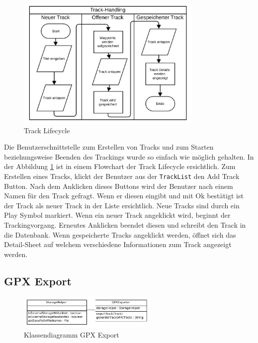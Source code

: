\begin{figure}[h]
  \centering
  \includegraphics[width=0.8\textwidth]{images/trackworkflow.pdf}
  \caption[Track Lifecycle]{Track Lifecycle}
  \label{fig:tracklifecycle}
\end{figure}

Die Benutzerschnittstelle zum Erstellen von Tracks und zum Starten beziehungsweise Beenden des Trackings wurde so einfach wie möglich gehalten. In der Abbildung \ref{fig:tracklifecycle} ist in einem Flowchart der Track Lifecycle ersichtlich. Zum Erstellen eines Tracks, klickt der Benutzer aus der \lstinline$TrackList$ den Add Track Button. Nach dem Anklicken dieses Buttons wird der Benutzer nach einem Namen für den Track gefragt. Wenn er diesen eingibt und mit Ok bestätigt ist der Track als neuer Track in der Liste ersichtlich. Neue Tracks sind durch ein Play Symbol markiert. Wenn ein neuer Track angeklickt wird, beginnt der Trackingvorgang. Erneutes Anklicken beendet diesen und schreibt den Track in die Datenbank. Wenn gespeicherte Tracks angeklickt werden, öffnet sich das Detail-Sheet auf welchem verschiedene Informationen zum Track angezeigt werden.

\subsection{GPX Export}
\begin{figure}[h]
  \centering
  \includegraphics[width=0.6\textwidth]{images/classdiag_exporter.pdf}
  \caption[Klassendiagramm GPX Export]{Klassendiagramm GPX Export}
  \label{fig:gpxclassdiag}
\end{figure}

